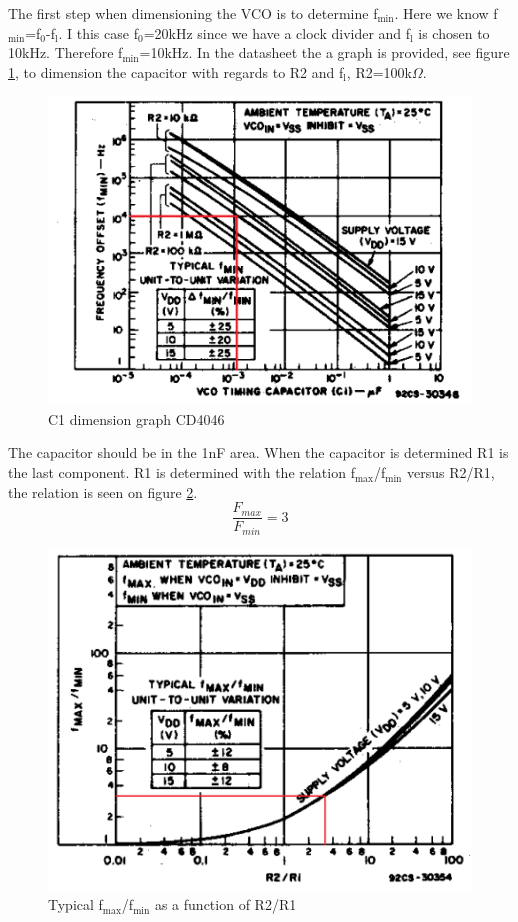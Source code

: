 The first step when dimensioning the VCO is to determine f$_{\text{min}}$. Here we know f$_{\text{min}}$=f$_{\text{0}}$-f$_{\text{l}}$. I this case f$_{\text{0}}$=20kHz since we have a clock divider and f$_{\text{l}}$ is chosen to 10kHz. Therefore f$_{\text{min}}$=10kHz. In the datasheet the a graph is provided, see figure \ref{graph:C1}, to dimension the capacitor with regards to R2 and f$_{\text{l}}$, R2=100k$\Omega$.

\begin{figure}[H]
	\centering
	\includegraphics[width=.6\textwidth]{billeder/c1_graph_cd4046}
	\caption{C1 dimension graph CD4046}
	\label{graph:C1}
\end{figure}

The capacitor should be in the 1nF area.  When the capacitor is determined R1 is the last component. R1 is determined with the relation f$_{\text{max}}$/f$_{\text{min}}$ versus R2/R1, the relation is seen on figure \ref{graph:R1}. 
\begin{equation}
	\frac{F_{max}}{F_{min}}=3
\end{equation}

\begin{figure}[H]
	\centering
	\includegraphics[width=.6\textwidth]{billeder/R1_graph_cd4046}
	\caption{Typical f$_{\text{max}}$/f$_{\text{min}}$ as a function of R2/R1}
	\label{graph:R1}
\end{figure}

